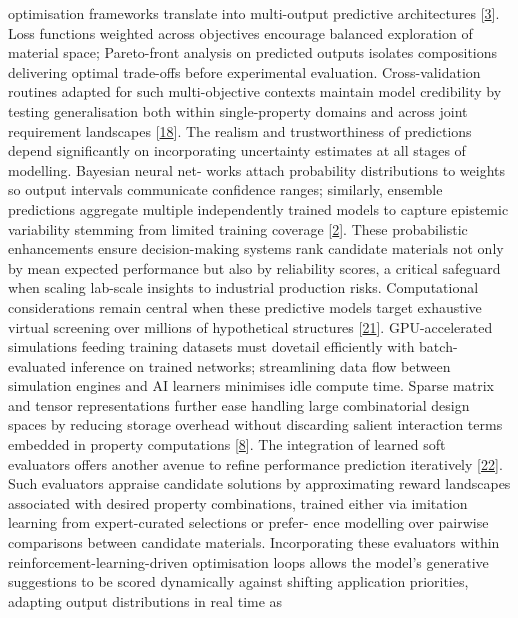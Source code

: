 \documentclass[
]{article}
\begin{document}
optimisation frameworks translate into multi-output predictive
architectures {[}\protect\hyperlink{_bookmark43}{3}{]}. Loss functions
weighted across objectives encourage balanced exploration of material
space; Pareto-front analysis on predicted outputs isolates compositions
delivering optimal trade-offs before experimental evaluation.
Cross-validation routines adapted for such multi-objective contexts
maintain model credibility by testing generalisation both within
single-property domains and across joint requirement landscapes
{[}\protect\hyperlink{_bookmark58}{18}{]}. The realism and
trustworthiness of predictions depend significantly on incorporating
uncertainty estimates at all stages of modelling. Bayesian neural net-
works attach probability distributions to weights so output intervals
communicate confidence ranges; similarly, ensemble predictions aggregate
multiple independently trained models to capture epistemic variability
stemming from limited training coverage
{[}\protect\hyperlink{_bookmark42}{2}{]}. These probabilistic
enhancements ensure decision-making systems rank candidate materials not
only by mean expected performance but also by reliability scores, a
critical safeguard when scaling lab-scale insights to industrial
production risks. Computational considerations remain central when these
predictive models target exhaustive virtual screening over millions of
hypothetical structures {[}\protect\hyperlink{_bookmark61}{21}{]}.
GPU-accelerated simulations feeding training datasets must dovetail
efficiently with batch-evaluated inference on trained networks;
streamlining data flow between simulation engines and AI learners
minimises idle compute time. Sparse matrix and tensor representations
further ease handling large combinatorial design spaces by reducing
storage overhead without discarding salient interaction terms embedded
in property computations {[}\protect\hyperlink{_bookmark48}{8}{]}. The
integration of learned soft evaluators offers another avenue to refine
performance prediction iteratively
{[}\protect\hyperlink{_bookmark62}{22}{]}. Such evaluators appraise
candidate solutions by approximating reward landscapes associated with
desired property combinations, trained either via imitation learning
from expert-curated selections or prefer- ence modelling over pairwise
comparisons between candidate materials. Incorporating these evaluators
within reinforcement-learning-driven optimisation loops allows the
model's generative suggestions to be scored dynamically against shifting
application priorities, adapting output distributions in real time as
\end{document}
